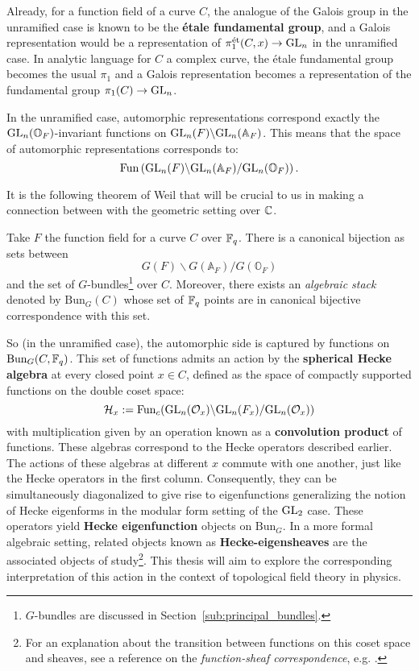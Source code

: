 Already, for a function field of a curve $C$, the analogue of the Galois group in the unramified case is known to be the \textbf{\'etale fundamental group}, and a Galois representation would be a representation of $\pi_1^{\text{\'et}}(C,x) \to \mathrm{GL}_n$ in the unramified case. In analytic language for $C$ a complex curve, the \'etale fundamental group becomes the usual $\pi_1$ and a Galois representation becomes a representation of the fundamental group $\pi_1(C) \to \mathrm{GL}_n$. 

In the unramified case, automorphic representations correspond exactly the $\mathrm{GL}_n(\mathbb O_F)$-invariant functions on $\mathrm{GL}_n (F)\backslash \mathrm{GL}_n(\mathbb A_F)$. This means that the space of automorphic representations corresponds to:
\[
	\mathrm{Fun} \left(\mathrm{GL}_n (F)\backslash \mathrm{GL}_n(\mathbb A_F)/\mathrm{GL}_n(\mathbb O_F) \right).
\]

It is the following theorem of Weil that will be crucial to us in making a connection between with the geometric setting over $\mathbb{C}$.
\begin{theorem}
	Take $F$ the function field for a curve $C$ over $\mathbb{F}_q$. There is a canonical bijection as sets between
	\[
		G (F)\backslash G(\mathbb A_F)/G(\mathbb O_F)
	\]
	and the set of $G$-bundles\footnote{$G$-bundles are discussed in Section~\ref{sub:principal_bundles}.} over $C$. Moreover, there exists an \emph{algebraic stack} denoted by $\mathrm{Bun}_G(C)$ whose set of $\mathbb{F}_q$ points are in canonical bijective correspondence with this set.
\end{theorem}

So (in the unramified case), the automorphic side is captured by functions on $\mathrm{Bun}_G(C, \mathbb{F}_q)$. 
This set of functions admits an action by the \textbf{spherical Hecke algebra} at every closed point $x \in C$, defined as the space of compactly supported functions on the double coset space:
\[
	\mathcal H_x := \mathrm{Fun}_c (\mathrm{GL}_n (\mathcal O_x)\backslash \mathrm{GL}_n(F_x)/\mathrm{GL}_n(\mathcal O_x))
\]
with multiplication given by an operation known as a \textbf{convolution product} of functions. These algebras correspond to the Hecke operators described earlier. The actions of these algebras at different $x$ commute with one another, just like the Hecke operators in the first column. Consequently, they can be simultaneously diagonalized to give rise to eigenfunctions generalizing the notion of Hecke eigenforms in the modular form setting of the $\mathrm{GL}_2$ case. These operators yield \textbf{Hecke eigenfunction} objects on $\mathrm{Bun}_G$. In a more formal algebraic setting, related objects known as \textbf{Hecke-eigensheaves} are the associated objects of study\footnote{For an explanation about the transition between functions on this coset space and sheaves, see a reference on the \emph{function-sheaf correspondence}, e.g. \cite{shin2005}.}. This thesis will aim to explore the corresponding interpretation of this action in the context of topological field theory in physics.


